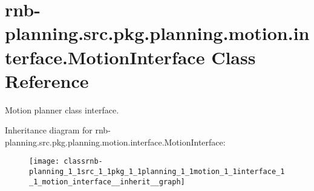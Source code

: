 \hypertarget{classrnb-planning_1_1src_1_1pkg_1_1planning_1_1motion_1_1interface_1_1_motion_interface}{}\section{rnb-\/planning.src.\+pkg.\+planning.\+motion.\+interface.\+Motion\+Interface Class Reference}
\label{classrnb-planning_1_1src_1_1pkg_1_1planning_1_1motion_1_1interface_1_1_motion_interface}


Motion planner class interface.  




Inheritance diagram for rnb-\/planning.src.\+pkg.\+planning.\+motion.\+interface.\+Motion\+Interface\+:
\nopagebreak
\begin{figure}[H]
\begin{center}
\leavevmode
\texttt{[image: classrnb-planning\_1\_1src\_1\_1pkg\_1\_1planning\_1\_1motion\_1\_1interface\_1\_1\_motion\_interface\_\_inherit\_\_graph]}
\end{center}
\end{figure}
